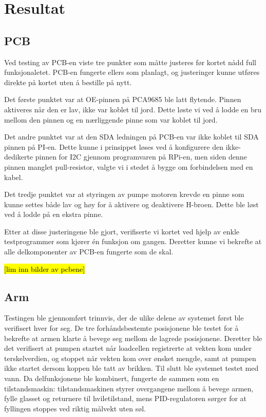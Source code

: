 \section{Resultat}
\subsection{PCB}
Ved testing av PCB-en viste tre punkter som måtte justeres før kortet nådd full funksjonaletet. PCB-en fungerte ellers som planlagt, og justeringer kunne utføres direkte på kortet uten å bestille på nytt. 

Det første punktet var at OE-pinnen på PCA9685 ble latt flytende. Pinnen aktiveres når den er lav, ikke var koblet til jord. Dette løste vi ved å lodde en bru mellom den pinnen og en nærliggende pinne som var koblet til jord.

Det andre punktet var at den SDA ledningen på PCB-en var ikke koblet til SDA pinnen på PI-en. Dette kunne i prinsippet løses ved å konfigurere den ikke-dedikerte pinnen for I2C gjennom programvaren på RPi-en, men siden denne pinnen manglet pull-resistor, valgte vi i stedet å bygge om forbindelsen med en kabel.

Det tredje punktet var at styringen av pumpe motoren krevde en pinne som kunne settes både lav og høy for å aktivere og deaktivere H-broen. Dette ble løst ved å lodde på en ekstra pinne.

Etter at disse justeringene ble gjort, verifiserte vi kortet ved hjelp av enkle testprogrammer som kjører én funksjon om gangen. Deretter kunne vi bekrefte at alle delkomponenter av PCB-en fungerte som de skal.

\hl{[lim inn bilder av pcbene]}

\subsection{Arm}
Testingen ble gjennomført trinnvis, der de ulike delene av systemet først ble verifisert hver for seg. De tre forhåndsbestemte posisjonene ble testet for å bekrefte at armen klarte å bevege seg mellom de lagrede posisjonene. Deretter ble det verifisert at pumpen startet når loadcellen registrerte at vekten kom under terskelverdien, og stoppet når vekten kom over ønsket mengde, samt at pumpen ikke startet dersom koppen ble tatt av brikken. Til slutt ble systemet testet med vann. Da delfunksjonene ble kombinert, fungerte de sammen som en tilstandsmaskin: tilstandsmaskinen styrer overgangene mellom å bevege armen, fylle glasset og returnere til hviletilstand, mens PID-regulatoren sørger for at fyllingen stoppes ved riktig målvekt uten søl.

